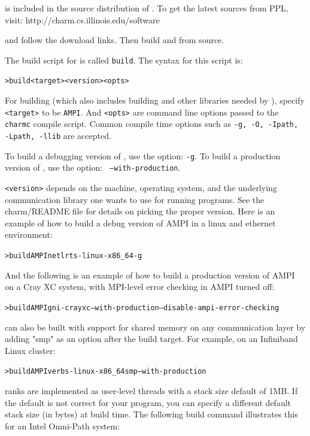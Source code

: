 \documentclass[10pt]{article}
\begin{document}
\ampi{} is included in the source distribution of \charmpp{}.
To get the latest sources from PPL, visit:
	http://charm.cs.illinois.edu/software

and follow the download links.
Then build \charmpp{} and \ampi{} from source.

The build script for \charmpp{} is called \texttt{build}. The syntax for this
script is:

\begin{alltt}
> build <target> <version> <opts>
\end{alltt}

For building \ampi{} (which also includes building \charmpp{} and other
libraries needed by \ampi{}), specify \verb+<target>+ to be \verb+AMPI+. And
\verb+<opts>+ are command line options passed to the \verb+charmc+ compile
script.  Common compile time options such as \texttt{-g, -O, -Ipath, -Lpath,
-llib} are accepted.

To build a debugging version of \ampi{}, use the option: \texttt{-g}.
To build a production version of \ampi{}, use the option: \texttt{
--with-production}.

\verb+<version>+ depends on the machine, operating system, and the underlying
communication library one wants to use for running \ampi{} programs.
See the charm/README file for details on picking the proper version.
Here is an example of how to build a debug version of AMPI in a
linux and ethernet environment:

\begin{alltt}
> build AMPI netlrts-linux-x86_64 -g
\end{alltt}

And the following is an example of how to build a production version of AMPI on a
Cray XC system, with MPI-level error checking in AMPI turned off:

\begin{alltt}
> build AMPI gni-crayxc --with-production --disable-ampi-error-checking
\end{alltt}

\ampi{} can also be built with support for shared memory on any communication layer
by adding "smp" as an option after the build target. For example, on an Infiniband Linux cluster:
\begin{alltt}
> build AMPI verbs-linux-x86_64 smp --with-production
\end{alltt}

\ampi{} ranks are implemented as user-level threads with a stack size default of 1MB.
If the default is not correct for your program, you can specify a different default
stack size (in bytes) at build time. The following build command illustrates this
for an Intel Omni-Path system:
\end{document}
